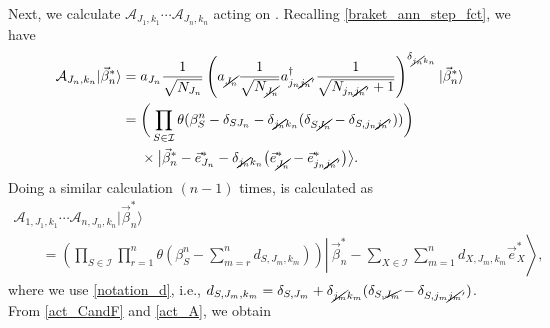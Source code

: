 \documentclass[pdftex]{sigma}
\numberwithin{equation}{section}
\begin{document}
Next, we calculate
$
\mathcal{A}_{
J_{1},
k_{1}
}
\cdots
\mathcal{A}_{
J_{n},
k_{n}
}
$
acting on
.
Recalling \eqref{braket_ann_step_fct}, we have
\begin{align*} %
 \mathcal{A}_{ J_{n}, k_{n} }
|
 \vec{\beta}_{n}^{\ast}
\rangle
 ={}&
 a_{J_{n}}
 \frac{1}{\sqrt{N_{J_{n}}}}
 \left(
 a_{\cancel{J_{n}}}
 \frac{1}{
 \sqrt{
 N_{\cancel{J_{n}}}
 }
 }
 a_{j_{n}\cancel{j_{n}}'}^{\dagger}
 \frac{1}{
 \sqrt{
 N_{j_{n}\cancel{j_{n}}'}+1
 }
 }
 \right)^{\delta_{\cancel{j_{n}}k_{n}}}
|
 \vec{\beta}_{n}^{\ast}
\rangle
 \\
 ={}&
 \bigg(
 \prod_{
 S
 \in
 \mathcal{I}
 }
 \theta
 (
 \beta_{S}^{n}
 -
 \delta_{SJ_{n}}
 -
 \delta_{\cancel{j_{n}}k_{n}}
 (
 \delta_{S\cancel{J_{n}}}
 -
 \delta_{S,j_{n}\cancel{j_{n}}'}
 )
 )
 \bigg)\\
&\times
 \big|
 \vec{\beta}_{n}^{\ast}
 -
 \vec{e}_{J_{n}}^{\ast}
 -
 \delta_{\cancel{j_{n}}k_{n}}
 \bigl(
 \vec{e}_{\cancel{J_{n}}}^{\ast}
 -
 \vec{e}_{j_{n}\cancel{j_{n}}'}^{\ast}
 \bigr)
 \big\rangle
 .
\end{align*}
Doing a similar calculation $(n-1)$ times,
is calculated as
\begin{gather}
 \mathcal{A}_{
 1,
 J_{1},
 k_{1}
 }
 \cdots
 \mathcal{A}_{
 n,
 J_{n},
 k_{n}
 }
|
 \vec{\beta}_{n}^{\ast}
\rangle\nonumber\\
 \qquad
 =
 \left(
 \prod_{
 S
 \in
 \mathcal{I}
 }
 \prod_{r=1}^{n}
 \theta
 \left(
 \beta_{S}^{n}
 -
 \sum_{m=r}^{n}
 d_{
 S,
 J_{m},
 k_{m}
 }
 \right)
 \right)
 \left|\,
 \vec{\beta}_{n}^{\ast}
 -
 \sum_{
 X
 \in
 \mathcal{I}
 }
 \sum_{m=1}^{n}
 d_{
 X,
 J_{m},
 k_{m}
 }
 \vec{e}_{X}^{\ast}
 \right\rangle
 ,
 \label{act_A}
\end{gather}
where we use \eqref{notation_d}, i.e.,
$
d_{
 S,
 J_{m},
 k_{m}
}
=
\delta_{
 S,
 J_{m}
}
+
\delta_{\cancel{j_{m}}k_{m}}
 (
 \delta_{
 S,
 \cancel{J_{m}}
 }
 -
 \delta_{
 S,
 j_{m}\cancel{j_{m}}'
 }
 )
$.
From \eqref{act_CandF} and \eqref{act_A}, we obtain
\end{document}
